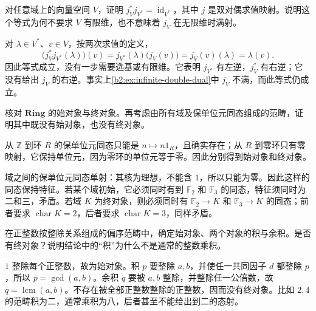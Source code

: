 \begin{exercise}\label{b2:ex:05-evaluation-dual}
	对任意域上的向量空间 \(V\)，证明 \(j_V^*j_{V^*}=\operatorname{id}_{V^*}\)，其中 \(j\) 是双对偶求值映射。说明这个等式为何不要求 \(V\) 有限维，也不意味着 \(j_V\) 在无限维时满射。
\end{exercise}
\begin{solution}
	对 \(\lambda\in V^*\)、\(v\in V\)，按两次求值的定义，
	\[
		\bigl(j_V^*j_{V^*}(\lambda)\bigr)(v) =j_{V^*}(\lambda)\bigl(j_V(v)\bigr) =j_V(v)(\lambda)=\lambda(v).
	\]
	因此等式成立，没有一步需要选基或有限维。它表明 \(j_{V^*}\) 有左逆，\(j_V^*\) 有右逆；它没有给出 \(j_V\) 的右逆。事实上\cref{b2:ex:infinite-double-dual}中 \(j_V\) 不满，而此等式仍成立。
\end{solution}

\begin{exercise}\label{b2:ex:05-initial-terminal-rings}
	核对 \(\mathbf{Ring}\) 的始对象与终对象。再考虑由所有域及保单位元同态组成的范畴，证明其中既没有始对象，也没有终对象。
\end{exercise}
\begin{solution}
	从 \(\mathbb Z\) 到环 \(R\) 的保单位元同态只能是 \(n\mapsto n1_R\)，且确实存在；从 \(R\) 到零环只有零映射，它保持单位元，因为零环的单位元等于零。因此分别得到始对象和终对象。

	域之间的保单位元同态单射：其核为理想，不能含 \(1\)，所以只能为零。因此这样的同态保持特征。若某个域初始，它必须同时有到 \(\mathbb F_2\) 和 \(\mathbb F_3\) 的同态，特征须同时为二和三，矛盾。若域 \(K\) 为终对象，则必须同时有 \(\mathbb F_2\rightarrow K\) 和 \(\mathbb F_3\rightarrow K\) 的同态；前者要求 \(\operatorname{char}K=2\)，后者要求 \(\operatorname{char}K=3\)，同样矛盾。
\end{solution}

\begin{exercise}\label{b2:ex:05-divisibility-products}
	在正整数按整除关系组成的偏序范畴中，确定始对象、两个对象的积与余积。是否有终对象？说明结论中的“积”为什么不是通常的整数乘积。
\end{exercise}
\begin{solution}
	\(1\) 整除每个正整数，故为始对象。积 \(p\) 要整除 \(a,b\)，并使任一共同因子 \(d\) 都整除 \(p\)，所以 \(p=\gcd(a,b)\)。余积 \(q\) 要被 \(a,b\) 整除，并整除任一公倍数，故 \(q=\operatorname{lcm}(a,b)\)。不存在被全部正整数整除的正整数，因而没有终对象。比如 \(2,4\) 的范畴积为二，通常乘积为八，后者甚至不能给出到二的态射。
\end{solution}

